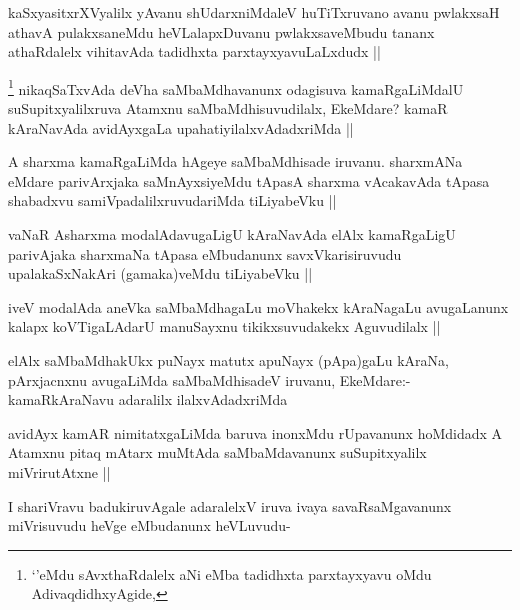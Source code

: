 
\begin{artha}
kaSxyasitxrXVyalilx yAvanu shUdarxniMdaleV huTiTxruvano avanu pwlakxsaH athavA pulakxsaneMdu heVLalapxDuvanu pwlakxsaveMbudu tananx athaRdalelx vihitavAda tadidhxta parxtayxyavuLaLxdudx ||
\end{artha}

\begin{artha}
\footnote{`\stext'eMdu sAvxthaRdalelx aNi eMba tadidhxta parxtayxyavu oMdu AdivaqdidhxyAgide,}
nikaqSaTxvAda deVha saMbaMdhavanunx odagisuva kamaRgaLiMdalU suSupitxyalilxruva Atamxnu saMbaMdhisuvudilalx, EkeMdare? kamaR kAraNavAda avidAyxgaLa upahatiyilalxvAdadxriMda || 
\end{artha}


\begin{artha}
A sharxma kamaRgaLiMda hAgeye saMbaMdhisade iruvanu. sharxmANa eMdare parivArxjaka saMnAyxsiyeMdu tApasA sharxma vAcakavAda tApasa shabadxvu samiVpadalilxruvudariMda tiLiyabeVku ||
\end{artha}

\begin{artha}
vaNaR Asharxma modalAdavugaLigU kAraNavAda elAlx kamaRgaLigU parivAjaka sharxmaNa tApasa eMbudanunx savxVkarisiruvudu upalakaSxNakAri (gamaka)veMdu tiLiyabeVku ||
\end{artha}

\begin{artha}
iveV modalAda aneVka saMbaMdhagaLu moVhakekx kAraNagaLu avugaLanunx kalapx koVTigaLAdarU manuSayxnu tikikxsuvudakekx Aguvudilalx ||
\end{artha}

\begin{artha}
elAlx saMbaMdhakUkx puNayx matutx apuNayx (pApa)gaLu kAraNa, pArxjacnxnu avugaLiMda saMbaMdhisadeV iruvanu, EkeMdare:- kamaRkAraNavu adaralilx ilalxvAdadxriMda
\end{artha}

\begin{artha}
avidAyx kamAR nimitatxgaLiMda baruva inonxMdu rUpavanunx hoMdidadx A Atamxnu pitaq mAtarx muMtAda saMbaMdavanunx suSupitxyalilx miVrirutAtxne ||
\end{artha}


\begin{artha}
I shariVravu badukiruvAgale adaralelxV iruva ivaya savaRsaMgavanunx miVrisuvudu heVge eMbudanunx heVLuvudu-
\end{artha}

